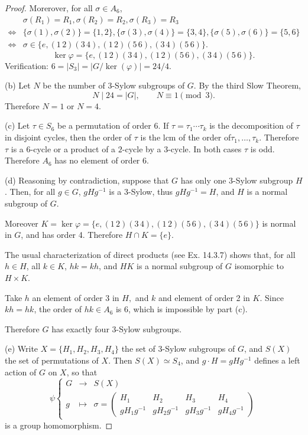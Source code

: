 \documentclass[11pt,a4paper]{article}
\begin{document}
\begin{proof}
Morerover, for all $\sigma \in A_6$,
\begin{align*}
&\sigma(R_1) = R_1, \sigma(R_2) = R_2, \sigma(R_3) = R_3\\
\iff& \{\sigma(1), \sigma(2)\} = \{1,2\}, \{\sigma(3),\sigma(4)\} = \{3,4\}, \{\sigma(5),\sigma(6)\} = \{5,6\}\\
\iff &\sigma \in \{e,(1\,2)(3\,4), (1\,2)(5\,6), (3\,4)(5\,6)\}.
\end{align*}
$$\ker \varphi = \{e,(1\,2)(3\,4), (1\,2)(5\,6), (3\,4)(5\,6)\}.$$
Verification: $6 = |S_3| = |G/\ker(\varphi)| = 24/4$.

\item[(b)] Let $N$ be the number of $3$-Sylow subgroups of $G$. By the third Slow Theorem,
$$N \mid 24 = |G|, \qquad N \equiv 1 \pmod 3.$$
Therefore $N = 1$ or $N = 4$.

\item[(c)] Let $\tau \in S_6$ be a permutation of order 6. If $\tau = \tau_1\cdots \tau_k$ is the decomposition of $\tau$ in disjoint cycles, then the order of $\tau$ is the lcm of the order of$ \tau_1,\ldots,\tau_k$. Therefore $\tau$ is a $6$-cycle or a product of a $2$-cycle by a $3$-cycle. In both cases $\tau$ is odd. Therefore $A_6$ has no element of order $6$.


\item[(d)] Reasoning by contradiction, suppose that $G$ has only one $3$-Sylow subgroup $H$. Then, for all $g \in G$, $gH g^{-1}$ is a $3$-Sylow, thus $gH g^{-1} = H$, and $H$ is a normal subgroup of $G$. 

Moreover $K = \ker \varphi = \{e,(1\,2)(3\,4), (1\,2)(5\,6), (3\,4)(5\,6)\}$ is normal in $G$, and has order 4. Therefore $H \cap K = \{e\}$.

The usual characterization of direct products (see Ex. 14.3.7) shows that, for all $h \in H$, all $k \in K$, $hk = kh$, and $HK$ is a normal subgroup of $G$ isomorphic to $H \times K$. 

Take $h$ an element of order $3$ in $H,$ and $k$ and element of order 2 in $K$. Since $kh = hk$, the order of $hk \in A_6$ is 6, which is impossible by part (c).

Therefore $G$ has exactly four $3$-Sylow subgroups.

\item[(e)] Write $X = \{H_1,H_2,H_3,H_4\}$ the set of $3$-Sylow subgroups of $G$, and $S(X)$ the set of permutations of $X$. Then $S(X) \simeq S_4$, and $g\cdot H = g H g^{-1}$ defines a left action of $G$ on $X$, so that
$$
\psi 
\left\{
\begin{array}{ccc}
G & \to & S(X)\\
g & \mapsto & 
\sigma = \left(
    \begin{array}{cccc}
      H_1&H_2&H_3&H_4\\
      gH_1g^{-1} & gH_2 g^{-1} & gH_3g^{-1} & gH_4g^{-1}
    \end{array}
\right)
\end{array}
\right.
$$
is a group homomorphism.


\end{proof}
\end{document}
